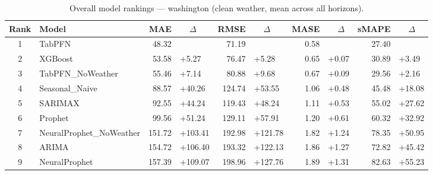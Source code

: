 \begin{table}[ht!]
\centering
\caption{Overall model rankings — washington (clean weather, mean across all horizons).}
\label{tab:overall_rankings_washington}
{\small
\setlength{\tabcolsep}{3pt}
\scriptsize
\begin{tabular}{clrlrlrlrl}
\toprule
Rank & Model & MAE & ~~\(\Delta\) & RMSE & ~~\(\Delta\) & MASE & ~~\(\Delta\) & sMAPE & ~~\(\Delta\) \\
\midrule
1 & TabPFN & 48.32 &  & 71.19 &  & 0.58 &  & 27.40 &  \\
2 & XGBoost & 53.58 & +5.27 & 76.47 & +5.28 & 0.65 & +0.07 & 30.89 & +3.49 \\
3 & TabPFN_NoWeather & 55.46 & +7.14 & 80.88 & +9.68 & 0.67 & +0.09 & 29.56 & +2.16 \\
4 & Seasonal_Naive & 88.57 & +40.26 & 124.74 & +53.55 & 1.06 & +0.48 & 45.48 & +18.08 \\
5 & SARIMAX & 92.55 & +44.24 & 119.43 & +48.24 & 1.11 & +0.53 & 55.02 & +27.62 \\
6 & Prophet & 99.56 & +51.24 & 129.11 & +57.91 & 1.20 & +0.61 & 60.32 & +32.92 \\
7 & NeuralProphet_NoWeather & 151.72 & +103.41 & 192.98 & +121.78 & 1.82 & +1.24 & 78.35 & +50.95 \\
8 & ARIMA & 154.72 & +106.40 & 193.32 & +122.13 & 1.86 & +1.27 & 72.82 & +45.42 \\
9 & NeuralProphet & 157.39 & +109.07 & 198.96 & +127.76 & 1.89 & +1.31 & 82.63 & +55.23 \\
\bottomrule
\end{tabular}
}
\end{table}
